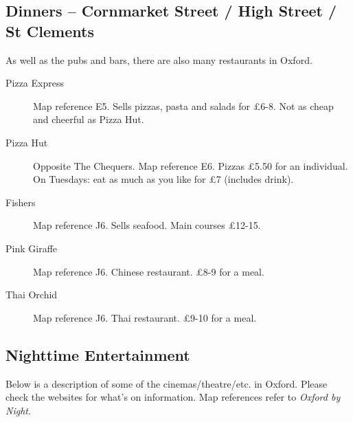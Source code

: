 \subsection{Dinners -- Cornmarket Street / High Street / St Clements}

As well as the pubs and bars, there are also many restaurants in Oxford.

\begin{description}

\item[Pizza Express] Map reference E5.  Sells pizzas, pasta and salads for \pounds 6-8.  Not as cheap and cheerful as Pizza Hut.

\item[Pizza Hut] Opposite The Chequers.  Map reference E6.  Pizzas \pounds 5.50 for an individual.  On Tuesdays: eat as much as you like for \pounds 7 (includes drink).

\item[Fishers] Map reference J6.  Sells seafood.  Main courses \pounds 12-15.

\item[Pink Giraffe] Map reference J6.  Chinese restaurant.  \pounds 8-9 for a meal.

\item[Thai Orchid] Map reference J6.  Thai restaurant.  \pounds 9-10 for a meal.

\end{description}


\subsection{Nighttime Entertainment}

Below is a description of some of the cinemas/theatre/etc. in Oxford.  Please check the websites for what's on information.  Map references refer to \textit{Oxford by Night}.

